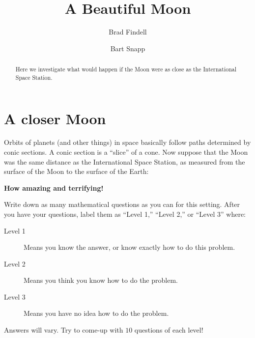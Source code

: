 \documentclass{ximera}
\author{Brad Findell \and Bart Snapp}
\title{A Beautiful Moon}
\begin{document}
\begin{abstract}
Here we investigate what would happen if the Moon were as close as the
International Space Station.
\end{abstract}
\maketitle

\section{A closer Moon}

Orbits of planets (and other things) in space basically follow paths
determined by conic sections. A conic section is a ``slice'' of a
cone. Now suppose that the Moon was the same distance as the International
Space Station, as measured from the surface of the Moon to the surface
of the Earth: 

\begin{center}
\textbf{How amazing and terrifying!}
\end{center}
\begin{problem}
     Write down as many mathematical questions as you can for this
     setting. After you have your questions, label them as ``Level
     1,'' ``Level 2,'' or ``Level 3'' where:
\begin{description}
\item[Level 1] Means you know the answer, or know exactly how to do
  this problem.
\item[Level 2] Means you think you know how to do the problem.
\item[Level 3] Means you have no idea how to do the problem.
\end{description}
\begin{freeResponse}
  Answers will vary. Try to come-up with $10$ questions of each level!
\end{freeResponse}
\end{problem}
\end{document}

